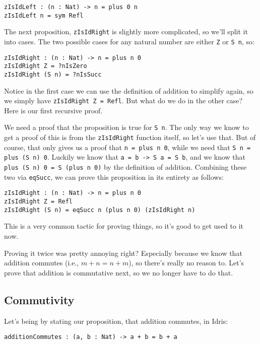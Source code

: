 \documentclass{article}
\newcommand{\inline}[1]{\texttt{#1}}
\begin{document}
\begin{verbatim}
zIsIdLeft : (n : Nat) -> n = plus 0 n
zIsIdLeft n = sym Refl
\end{verbatim}

The next proposition, \inline{zIsIdRight} is slightly more complicated, so we'll split it into cases.
The two possible cases for any natural number are either \inline{Z} or \inline{S n}, so:

\begin{verbatim}
zIsIdRight : (n : Nat) -> n = plus n 0
zIsIdRight Z = ?nIsZero
zIsIdRight (S n) = ?nIsSucc
\end{verbatim}

Notice in the first case we can use the definition of addition to simplify again, so we simply have \inline{zIsIdRight Z = Refl}.
But what do we do in the other case?
Here is our first recursive proof.

We need a proof that the proposition is true for \inline{S n}.
The only way we know to get a proof of this is from the \inline{zIsIdRight} function itself, so let's use that.
But of course, that only gives us a proof that \inline{n = plus n 0}, while we need that \inline{S n = plus (S n) 0}.
Luckily we know that \inline{a = b -> S a = S b}, and we know that \inline{plus (S n) 0 = S (plus n 0)} by the definition of addition.
Combining these two via \inline{eqSucc}, we can prove this proposition in its entirety as follows:

\begin{verbatim}
zIsIdRight : (n : Nat) -> n = plus n 0
zIsIdRight Z = Refl
zIsIdRight (S n) = eqSucc n (plus n 0) (zIsIdRight n)
\end{verbatim}

This is a very common tactic for proving things, so it's good to get used to it now.

Proving it twice was pretty annoying right?
Especially because we know that addition commutes (i.e., $m + n = n + m$), so there's really no reason to.
Let's prove that addition is commutative next, so we no longer have to do that.

\subsection{Commutivity}
Let's being by stating our proposition, that addition commutes, in Idris:

\begin{verbatim}
additionCommutes : (a, b : Nat) -> a + b = b + a
\end{verbatim}
\end{document}
